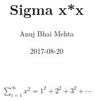 \documentclass{article}
\title{Sigma x*x}
\date{2017-08-20}
\author{Anuj Bhai Mehta}
\begin{document}
\maketitle

\begin{align*}
	\sum_{i=1}^{\infty} x^2 = 1^2 + 2^2 +3^2+ \cdots
\end{align*}
\end{document}
